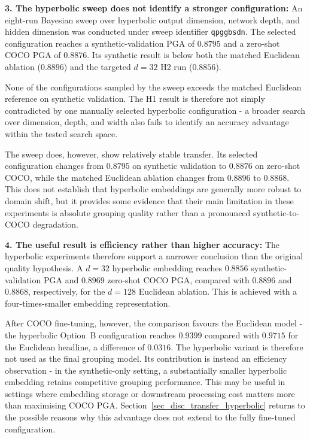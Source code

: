 \textbf{3. The hyperbolic sweep does not identify a stronger
configuration:}
An eight-run Bayesian sweep over hyperbolic output dimension,
network depth,
and hidden dimension was conducted under sweep identifier
\texttt{qpggbsdn}.
The selected configuration reaches a synthetic-validation PGA of
$0.8795$ and a zero-shot COCO PGA of $0.8876$.
Its synthetic result is below both the matched Euclidean ablation
($0.8896$) and the targeted $d=32$ H2 run ($0.8856$).

None of the configurations sampled by the sweep exceeds the matched
Euclidean reference on synthetic validation.
The H1 result is therefore not simply contradicted by one manually
selected hyperbolic configuration -
a broader search over dimension,
depth,
and width also fails to identify an accuracy advantage within the tested
search space.

The sweep does, however, show relatively stable transfer.
Its selected configuration changes from $0.8795$ on synthetic validation
to $0.8876$ on zero-shot COCO,
while the matched Euclidean ablation changes from $0.8896$ to $0.8868$.
This does not establish that hyperbolic embeddings are generally more
robust to domain shift,
but it provides some evidence that their main limitation in these
experiments is absolute grouping quality
rather than a pronounced synthetic-to-COCO degradation.

\textbf{4. The useful result is efficiency rather than higher
accuracy:}
The hyperbolic experiments therefore support a narrower conclusion than
the original quality hypothesis.
A $d=32$ hyperbolic embedding reaches $0.8856$ synthetic-validation PGA
and $0.8969$ zero-shot COCO PGA,
compared with $0.8896$ and $0.8868$, respectively,
for the $d=128$ Euclidean ablation.
This is achieved with a four-times-smaller embedding representation.

After COCO fine-tuning, however,
the comparison favours the Euclidean model -
the hyperbolic Option~B configuration reaches $0.9399$ compared with
$0.9715$ for the Euclidean headline,
a difference of $0.0316$.
The hyperbolic variant is therefore not used as the final grouping model.
Its contribution is instead an efficiency observation -
in the synthetic-only setting,
a substantially smaller hyperbolic embedding retains competitive
grouping performance.
This may be useful in settings where embedding storage or downstream
processing cost matters more than maximising COCO PGA.
Section~\ref{sec_disc_transfer_hyperbolic} returns to the possible
reasons why this advantage does not extend to the fully fine-tuned
configuration.